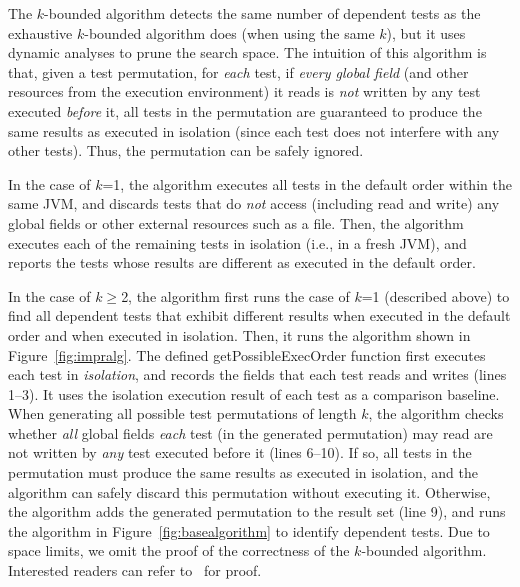 

The \dependenceaware{} $k$-bounded algorithm
detects the same number of dependent tests
as the exhaustive $k$-bounded algorithm does (when using the same $k$),
but it uses dynamic analyses to prune the search space.
The intuition of this algorithm is that, given
a test permutation, for \textit{each} test,
if \textit{every global field} (and other 
resources from the execution environment) it reads
is \textit{not} written by any test executed \textit{before} it,
all tests in the permutation are guaranteed to produce
the same results as executed in isolation (since each
test does not interfere with any other tests). Thus, the permutation
can be safely ignored. 

In the case of $k$=1, the algorithm executes all tests in the default order
within the same JVM, and discards tests that do \textit{not}
access (including read and write) any global fields or
other external resources such as a file. Then,
the algorithm executes each of the remaining tests in isolation (i.e., in a fresh JVM),
and reports the tests whose results are different as executed in
the default order.

In the case of $k\ge$2, the algorithm first runs the case of $k$=1 (described above)
to find all dependent tests that exhibit different results
when executed in the default order and when executed in isolation.
Then, it runs the algorithm shown in Figure~\ref{fig:impralg}.
%
The defined getPossibleExecOrder function first executes
each test in \textit{isolation}, and records the
fields that each test reads and writes (lines 1--3).
It uses the isolation execution result
of each test as a comparison baseline.
When generating all possible test permutations
of length $k$, the algorithm checks whether
\textit{all} global fields \textit{each} test (in the generated permutation)
may read are not written by \textit{any} test executed before it (lines 6--10).
If so, all tests in the permutation
must produce the same results as executed in isolation,
and the algorithm can safely discard this permutation without
executing it. Otherwise, the algorithm adds the generated
permutation to the result set (line 9), and runs the algorithm in Figure~\ref{fig:basealgorithm}
to identify dependent tests. %
Due to space limits, we omit the proof of the correctness
of the \dependenceaware{} $k$-bounded algorithm. Interested
readers can refer to~\cite{proof-dependence-aware} for proof.

